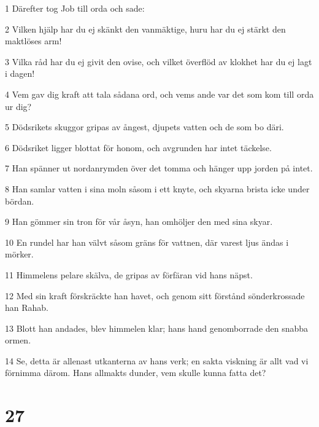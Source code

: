 \par 1 Därefter tog Job till orda och sade:
\par 2 Vilken hjälp har du ej skänkt den vanmäktige, huru har du ej stärkt den maktlöses arm!
\par 3 Vilka råd har du ej givit den ovise, och vilket överflöd av klokhet har du ej lagt i dagen!
\par 4 Vem gav dig kraft att tala sådana ord, och vems ande var det som kom till orda ur dig?
\par 5 Dödsrikets skuggor gripas av ångest, djupets vatten och de som bo däri.
\par 6 Dödsriket ligger blottat för honom, och avgrunden har intet täckelse.
\par 7 Han spänner ut nordanrymden över det tomma och hänger upp jorden på intet.
\par 8 Han samlar vatten i sina moln såsom i ett knyte, och skyarna brista icke under bördan.
\par 9 Han gömmer sin tron för vår åsyn, han omhöljer den med sina skyar.
\par 10 En rundel har han välvt såsom gräns för vattnen, där varest ljus ändas i mörker.
\par 11 Himmelens pelare skälva, de gripas av förfäran vid hans näpst.
\par 12 Med sin kraft förskräckte han havet, och genom sitt förstånd sönderkrossade han Rahab.
\par 13 Blott han andades, blev himmelen klar; hans hand genomborrade den snabba ormen.
\par 14 Se, detta är allenast utkanterna av hans verk; en sakta viskning är allt vad vi förnimma därom. Hans allmakts dunder, vem skulle kunna fatta det?

\chapter{27}

